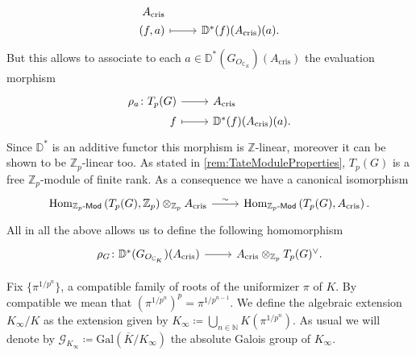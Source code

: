 \begin{rem}[]
\begin{equation*}
\begin{tikzcd}[row sep = 0ex
		,/tikz/column 1/.append style={anchor=base east}
		,/tikz/column 2/.append style={anchor=base west}]
		A_{\mathrm{cris}} \\
		(f,a) \arrow[r, "", mapsto] &
		\mathbb{D}^*(f)(A_{\mathrm{cris}})(a)
	.\end{tikzcd}
	\end{equation*} 
	But this allows to associate to each $a \in \mathbb{D}^*(G_{O_{\mathbb{C}_K}})(A_{\mathrm{cris}})$
	the evaluation morphism
	\begin{equation*}
	\begin{tikzcd}[row sep = 0ex
		,/tikz/column 1/.append style={anchor=base east}
		,/tikz/column 2/.append style={anchor=base west}]
		\rho_a\colon T_p(G)
		\arrow[r, "", rightarrow] &
		A_{\mathrm{cris}} \\
		f \arrow[r, "", mapsto] & 
		\mathbb{D}^*(f)(A_{\mathrm{cris}})(a)
	.\end{tikzcd}
	\end{equation*} 
	Since $\mathbb{D}^*$ is an additive functor this morphism
	is $\mathbb{Z}$-linear, moreover it can be shown to be $\mathbb{Z}_{p}$-linear too.
	As stated in \cref{rem:TateModuleProperties}, $T_p(G)$ is a free
	$\mathbb{Z}_{p}$-module of finite rank.
	As a consequence we have a canonical isomorphism
	\begin{equation*}
	\begin{tikzcd}[row sep = 0ex
		,/tikz/column 1/.append style={anchor=base east}
		,/tikz/column 2/.append style={anchor=base west}]
		\mathrm{Hom}_{\mathbb{Z}_{p}\text{-}\mathsf{Mod}}
		\left( T_p(G), \mathbb{Z}_{p} \right) \otimes_{\mathbb{Z}_{p}} A_{\mathrm{cris}}
		\arrow[r, "\sim", rightarrow] &
		\mathrm{Hom}_{ \mathbb{Z}_{p}\text{-}\mathsf{Mod} } \left( T_p(G), A_{\mathrm{cris}} \right)
	.\end{tikzcd}
	\end{equation*} 
	All in all the above allows us to define the following
	homomorphism
	\begin{equation*}
	\begin{tikzcd}[row sep = 0ex
		,/tikz/column 1/.append style={anchor=base east}
		,/tikz/column 2/.append style={anchor=base west}]
		\rho_G\colon 
		\mathbb{D}^*(G_{O_{\mathbb{C}_K}})(A_{\mathrm{cris}})
		\arrow[r, "", rightarrow] &
		A_{\mathrm{cris}} \otimes_{\mathbb{Z}_{p}} T_p(G)^\vee
	.\end{tikzcd}
	\end{equation*} 
\end{rem}


\begin{defn}[]
	Fix $\big\{ \pi^{1/p^n} \big\}$,
	a compatible family of roots of the uniformizer $\pi$ of $K$.
	By compatible we mean that $(\pi^{1/p^n})^p = \pi^{1/p^{n-1}}$.
	We define the algebraic extension $K_{\infty}/K$ as the extension given
	by $K_\infty \coloneqq \bigcup_{n \in \mathbb{N}} K(\pi^{1/p^n})$.
	As usual we will denote by $\mathscr{G}_{K_\infty} \coloneqq \mathrm{Gal}
	\left( \overline{K} / K_\infty \right)$ 
	the absolute Galois group of $K_\infty$.
\end{defn}


